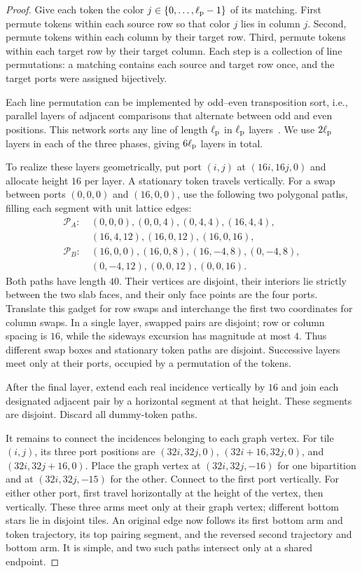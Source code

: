 \begin{proof}
Give each token the color $j\in\{0,\ldots,\ell_{\rm p}-1\}$ of its matching.
First permute tokens within each source row so that color $j$ lies in
column $j$. Second, permute tokens within each column by their target
row. Third, permute tokens within each target row by their target
column. Each step is a collection of line permutations: a matching
contains each source and target row once, and the target ports were
assigned bijectively.

Each line permutation can be implemented by odd--even transposition
sort, i.e., parallel layers of adjacent comparisons that alternate
between odd and even positions. This network sorts any line of length
$\ell_{\rm p}$ in $\ell_{\rm p}$ layers~\citep[Section~5.3.4]{knuth1998}. We use $2\ell_{\rm p}$
layers in each of the three phases, giving $6\ell_{\rm p}$ layers in total.

To realize these layers geometrically, put port $(i,j)$ at
$(16i,16j,0)$ and allocate height $16$ per layer. A stationary token
travels vertically. For a swap between ports $(0,0,0)$ and $(16,0,0)$,
use the following two polygonal paths, filling each segment with unit
lattice edges:
\begin{align*}
 \mathcal P_A:\ &(0,0,0),(0,0,4),(0,4,4),(16,4,4),\\
       &(16,4,12),(16,0,12),(16,0,16),\\
 \mathcal P_B:\ &(16,0,0),(16,0,8),(16,-4,8),(0,-4,8),\\
       &(0,-4,12),(0,0,12),(0,0,16).
\end{align*}
Both paths have length $40$. Their vertices are disjoint, their
interiors lie strictly between the two slab faces, and their only
face points are the four ports. Translate this gadget for row swaps
and interchange the first two coordinates for column swaps. In a
single layer, swapped pairs are disjoint; row or column spacing is
$16$, while the sideways excursion has magnitude at most $4$.
Thus different swap boxes and stationary token paths are disjoint.
Successive layers meet only at their ports, occupied by a permutation
of the tokens.

After the final layer, extend each real incidence vertically by $16$
and join each designated adjacent pair by a horizontal segment at that
height. These segments are disjoint. Discard all dummy-token paths.

It remains to connect the incidences belonging to each graph vertex.
For tile $(i,j)$, its three port positions
are $(32i,32j,0)$, $(32i+16,32j,0)$, and $(32i,32j+16,0)$.
Place the graph vertex at $(32i,32j,-16)$ for one
bipartition and at $(32i,32j,-15)$ for the other. Connect to the first port
vertically. For either other port, first travel horizontally at the
height of the vertex, then vertically. These three arms meet only at their graph
vertex; different bottom stars lie in disjoint tiles. An original
edge now follows its first bottom arm and token trajectory, its top
pairing segment, and the reversed second trajectory and bottom arm.
It is simple, and two such paths intersect only at a shared endpoint.


\end{proof}
